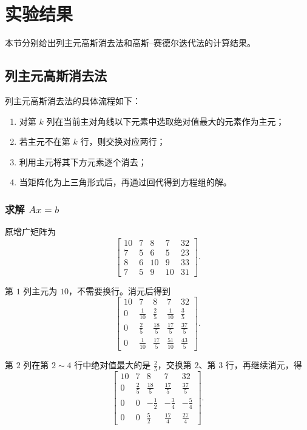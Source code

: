 \documentclass[12pt,a4paper]{ctexart}
\begin{document}
\section{实验结果}

本节分别给出列主元高斯消去法和高斯--赛德尔迭代法的计算结果。

\subsection{列主元高斯消去法}

列主元高斯消去法的具体流程如下：
\begin{enumerate}
    \item 对第 $k$ 列在当前主对角线以下元素中选取绝对值最大的元素作为主元；
    \item 若主元不在第 $k$ 行，则交换对应两行；
    \item 利用主元将其下方元素逐个消去；
    \item 当矩阵化为上三角形式后，再通过回代得到方程组的解。
\end{enumerate}

\subsubsection{求解 $Ax=b$}

原增广矩阵为
\[
\left[
\begin{array}{cccc|c}
10&7&8&7&32\\
7&5&6&5&23\\
8&6&10&9&33\\
7&5&9&10&31
\end{array}
\right].
\]

第 $1$ 列主元为 $10$，不需要换行。消元后得到
\[
\left[
\begin{array}{cccc|c}
10&7&8&7&32\\
0&\frac{1}{10}&\frac{2}{5}&\frac{1}{10}&\frac{3}{5}\\
0&\frac{2}{5}&\frac{18}{5}&\frac{17}{5}&\frac{37}{5}\\
0&\frac{1}{10}&\frac{17}{5}&\frac{51}{10}&\frac{43}{5}
\end{array}
\right].
\]

第 $2$ 列在第 $2\sim4$ 行中绝对值最大的是 $\frac{2}{5}$，交换第 $2$、第 $3$ 行，再继续消元，得
\[
\left[
\begin{array}{cccc|c}
10&7&8&7&32\\
0&\frac{2}{5}&\frac{18}{5}&\frac{17}{5}&\frac{37}{5}\\
0&0&-\frac{1}{2}&-\frac{3}{4}&-\frac{5}{4}\\
0&0&\frac{5}{2}&\frac{17}{4}&\frac{27}{4}
\end{array}
\right].
\]
\end{document}
